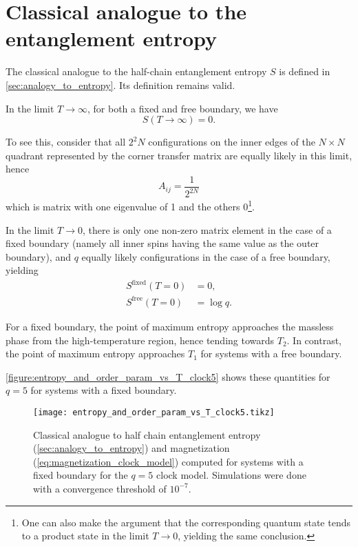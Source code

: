 \section{Classical analogue to the entanglement entropy}

The classical analogue to the half-chain entanglement entropy $S$ is defined in \autoref{sec:analogy_to_entropy}.
Its definition remains valid.

In the limit $T \to \infty$, for both a fixed and free boundary, we have
\begin{equation}
  S(T \to \infty) = 0.
\end{equation}

To see this, consider that all $2^2N$ configurations on the inner edges of the $N \times N$ quadrant represented by the
corner transfer matrix are equally likely in this limit, hence
\begin{equation}
  A_{i j} = \frac{1}{2^{2N}}
\end{equation}
which is matrix with one eigenvalue of 1 and the others 0\footnote{One can also make the argument that the corresponding
quantum state tends to a product state in the limit $T \to 0$,
yielding the same conclusion.}.

In the limit $T \to 0$, there is only one non-zero matrix element in the case of a fixed boundary (namely all inner
spins having the same value as the outer boundary), and $q$ equally likely configurations in the case of a free
boundary, yielding
\begin{align*}
  S^{\text{fixed}}(T = 0) &= 0, \\
  S^{\text{free}}(T = 0)  &= \log q.
\end{align*}

For a fixed boundary, the point of maximum entropy approaches the massless phase from the high-temperature region,
hence tending towards $T_2$.
In contrast, the point of maximum entropy approaches $T_1$ for systems with a free boundary.

\autoref{figure:entropy_and_order_param_vs_T_clock5} shows these quantities for $q = 5$ for systems with a fixed
boundary.

\begin{figure}
  \texttt{[image: entropy\_and\_order\_param\_vs\_T\_clock5.tikz]}
  \caption{Classical analogue to half chain entanglement entropy (\autoref{sec:analogy_to_entropy}) and magnetization
  (\autoref{eq:magnetization_clock_model}) computed for systems with a fixed boundary for the $q = 5$ clock model.
  Simulations were done with a convergence threshold of $10^{-7}$.}\label{figure:entropy_and_order_param_vs_T_clock5}
\end{figure}

